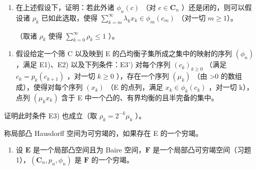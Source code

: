 \begin{enumerate}
\def\labelenumi{\alph{enumi})}
\tightlist
\item
  在上述假设下，证明：若此外诸 \(\phi_n(c)\) （对 \(c \in \mathbf{C}_n\) ）还是闭的，则可以假设诸 \(\rho_k\) 已如此选取，使得 \(\sum_{k=m}^{\infty} \lambda_k x_k \in \phi_m(c_m)\) （对一切 \(m \geqslant 1\)）。

（取诸 \(\rho_{k}\) 使得 \(\sum_{k=0}^{\infty} \rho_{k} \leqslant 1\) ）。
\end{enumerate}

\begin{enumerate}
\def\labelenumi{\alph{enumi})}
\setcounter{enumi}{1}
\tightlist
\item
  假设给定一个筛 C 以及映到 E 的凸均衡子集所成之集中的映射的序列 \((\phi_{n})\) ，满足 E1)、E2) 以及下列条件：E3') 对每个序列 \((c_{k})_{k\geq0}\) （满足 \(c_{k}=p_{k}(c_{k+1})\) ，对一切 \(k\geq0\) ），存在一个序列 \((\mu_{k})\) （由 \textgreater0 的数组成），使得对每个序列 \((x_{k})\) （E 的点列，满足 \(x_{k}\in\phi_{k}(c_{k})\) ，对一切 k），点列 \((\mu_{k}x_{k})\) 含于 E 中一个凸的、有界均衡的且半完备的集中。
\end{enumerate}

证明此时条件 E3) 也成立（取 \(\rho_{k} = 2^{-k}\mu_{k}\) ）。

称局部凸 Hausdorff 空间为可穷竭的，如果存在 E 的一个穷竭。

\begin{enumerate}
\def\labelenumi{\arabic{enumi})}
\setcounter{enumi}{1}
\tightlist
\item
  设 \(\mathbf{E}\) 是一个局部凸空间且为 Baire 空间，\(\mathbf{F}\) 是一个局部凸可穷竭空间（习题 1），\((\mathbf{C}_n, p_n, \phi_n)\) 是 \(\mathbf{F}\) 的一个穷竭。
\end{enumerate}

